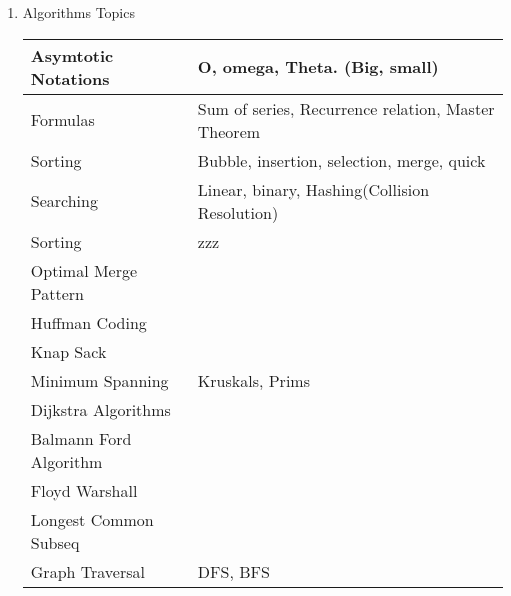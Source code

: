 \begin{enumerate}
    \item Algorithms Topics \\
        \begin{myTableStyle} \begin{tabular}{ |m{4cm}|m{12cm}| } \hline
                Asymtotic Notations     &     O, omega, Theta. (Big, small)    \\ \hline
                Formulas                &     Sum of series, Recurrence relation, Master Theorem    \\ \hline
                Sorting                 &     Bubble, insertion, selection, merge, quick    \\ \hline
                Searching               &     Linear, binary, Hashing(Collision Resolution)    \\ \hline
                Sorting                 &     zzz    \\ \hline
                Optimal Merge Pattern   &           \\ \hline
                Huffman Coding          &           \\ \hline
                Knap Sack               &           \\ \hline
                Minimum Spanning        &    Kruskals, Prims          \\ \hline
                Dijkstra Algorithms     &   \\ \hline
                Balmann Ford Algorithm  &   \\ \hline
                Floyd Warshall          &   \\ \hline
                Longest Common Subseq   &   \\ \hline
                Graph Traversal         &   DFS, BFS    \\ \hline
        \end{tabular} \end{myTableStyle} \vspace{0.08in}

\end{enumerate}

